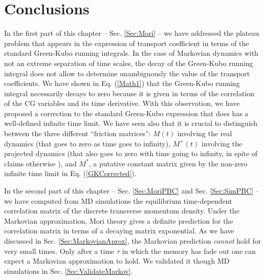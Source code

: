 \documentclass[a4paper,openright,12pt]{book}
\begin{document}
\section{Conclusions}
\label{Sec:ConclusionsChapPBC}
In the first part of this chapter -- Sec. \ref{Sec:Mori} -- we have addressed  the plateau problem that  appears in
the  expression of  transport  coefficient in  terms  of the  standard
Green-Kubo running integrals.  In the  case of Markovian dynamics with
not an extreme separation of time  scales, the decay of the Green-Kubo
running integral does  not allow to determine  unambiguously the value
of the  transport coefficients.  We  have shown in  Eq.  (\ref{Math1})
that  the  Green-Kubo  running  integral necessarily  decays  to  zero
because it  is given in terms  of the correlation of  the CG variables
and its  time derivative.  With  this observation, we have  proposed a
correction  to  the  standard  Green-Kubo  expression  that  does  has  a
well-defined infinite time limit. We have seen also that it is crucial
to  distinguish between  the  three  different ``friction  matrices'':
$M(t)$ involving the real dynamics (that  goes to zero as time goes to
infinity), $M^+(t)$  involving the projected dynamics  (that also goes
to zero  with time  going to  infinity, in  spite of  claims otherwise
\cite{Kubo1991,Espanol1993}),  and $M^*$,  a putative  constant
matrix   given    by   the    non-zero   infinite   time    limit   in
Eq. (\ref{GKCorrected}).


In the second part of this chapter -- Sec. \ref{Sec:MoriPBC} and Sec. \ref{Sec:SimPBC} --  we  have computed from  MD simulations  the equilibrium
time-dependent correlation matrix of  the discrete transverse momentum
density.   Under  the Markovian  approximation,  Mori  theory gives  a
definite prediction for the correlation  matrix in terms of a decaying
matrix exponential.   As we  have discussed in Sec. \ref{Sec:MarkovianAprox}, the  Markovian prediction
\textit{cannot}  hold for  very small  times. Only after a time $\tau$ in which the memory
has fade out one can expect a Markovian approximation to hold. We validated it though MD simulations in Sec. \ref{Sec:ValidateMarkov}.
\end{document}
